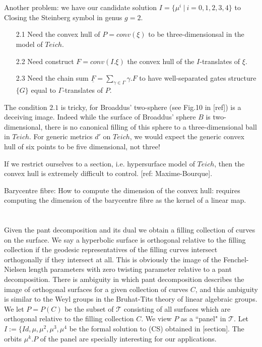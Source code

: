 \documentclass[12pt]{article}
\theoremstyle{definition}
\theoremstyle{remark}
\newcommand{\sT}{\mathscr{T}}
\begin{document}
\section{}
Another problem: we have our candidate solution $I=\{\mu^i~|~i=0,1,2,3,4\}$ to Closing the Steinberg symbol in genus $g=2$. 
\begin{itemize}
\item[2.1] Need the convex hull of $P=conv(\xi)$ to be three-dimensionsal in the model of $Teich$. 
\item[2.2] Need construct $F=conv(I.\xi)$ the convex hull of the $I$-translates of $\xi$. 
\item[2.3] Need the chain sum $\underline{F}=\sum_{\gamma \in \Gamma} \gamma . F$ to have well-separated gates structure $\{G\}$ equal to $\Gamma$-translates of $P$.
\end{itemize}

The condition $2.1$ is tricky, for Broaddus' two-sphere (see Fig.10 in [ref]) is a deceiving image. Indeed while the surface of Broaddus' sphere $B$ is two-dimensional, there is no canonical filling of this sphere to a three-dimensional ball in $Teich$. For generic metrics $d'$ on $Teich$, we would expect the generic convex hull of six points to be five dimensional, not three! 

If we restrict ourselves to a section, i.e. hypersurface model of $Teich$, then the convex hull is extremely difficult to control. [ref: Maxime-Bourque].

Barycentre fibre: How to compute the dimension of the convex hull: requires computing the dimension of the barycentre fibre as the kernel of a linear map. 


\section{}
Given the pant decomposition and its dual we obtain a filling collection of curves on the surface. We say a hyperbolic surface is orthogonal relative to the filling collection if the geodesic representatives of the filling curves intersect orthogonally if they intersect at all. This is obviously the image of the Fenchel-Nielsen length parameters with zero twisting parameter relative to a pant decomposition. There is ambiguity in which pant decomposition describes the image of orthogonal surfaces for a given collection of curves $C$, and this ambiguity is similar to the Weyl groups in the Bruhat-Tits theory of linear algebraic groups. We let $P=P(C)$ be the subset of $\sT$ consisting of all surfaces which are orthogonal relative to the filling collection $C$. We view $P$ as a ``panel" in $\sT$. Let $I:=\{Id, \mu, \mu^2, \mu^3, \mu^4$ be the formal solution to (CS) obtained in [section]. The orbits $\mu^k.P$ of the panel are specially interesting for our applications. 
\end{document}
